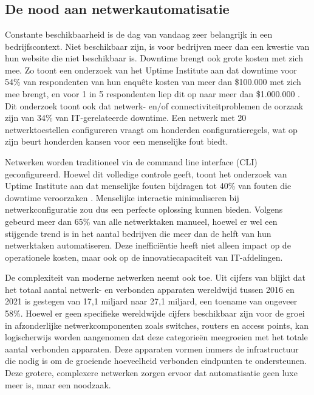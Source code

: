 \chapter{}%
\label{ch:stand-van-zaken}

\section{De nood aan netwerkautomatisatie}
\label{sec:automatisatie}

Constante beschikbaarheid is de dag van vandaag zeer belangrijk in een bedrijfscontext.
Niet beschikbaar zijn, is voor bedrijven meer dan een kwestie van hun website die niet beschikbaar is. 
Downtime brengt ook grote kosten met zich mee. Zo toont een onderzoek van het Uptime Institute aan dat downtime voor 54\% van respondenten van hun enquête kosten van meer dan \$100.000 met zich mee brengt, en voor 1 in 5 respondenten liep dit op naar meer dan \$1.000.000 \autocite{UptimeInstitute2025}.
Dit onderzoek toont ook dat netwerk- en/of connectiviteitproblemen de oorzaak zijn van 34\% van IT-gerelateerde downtime. Een netwerk met 20 netwerktoestellen configureren vraagt om honderden configuratieregels, wat op zijn beurt honderden kansen voor een menselijke fout biedt. 

Netwerken worden traditioneel via de command line interface (CLI) geconfigureerd.
Hoewel dit volledige controle geeft, toont het onderzoek van Uptime Institute aan dat menselijke fouten bijdragen tot 40\% van fouten die downtime veroorzaken \autocite{UptimeInstitute2025}. 
Menselijke interactie minimaliseren bij netwerkconfiguratie zou dus een perfecte oplossing kunnen bieden. 
Volgens \textcite{Gartner2023} gebeurd meer dan 65\% van alle netwerktaken manueel, hoewel er wel een stijgende trend is in het aantal bedrijven die meer dan de helft van hun netwerktaken automatiseren.
Deze inefficiëntie heeft niet alleen impact op de operationele kosten, maar ook op de innovatiecapaciteit van IT-afdelingen.

De complexiteit van moderne netwerken neemt ook toe. 
Uit cijfers van \textcite{shi2021devicegrowth} blijkt dat het totaal aantal netwerk- en verbonden apparaten wereldwijd tussen 2016 en 2021 is gestegen van 17,1 miljard naar 27,1 miljard, een toename van ongeveer 58\%.
Hoewel er geen specifieke wereldwijde cijfers beschikbaar zijn voor de groei in afzonderlijke netwerkcomponenten zoals switches, routers en access points, kan logischerwijs worden aangenomen dat deze categorieën meegroeien met het totale aantal verbonden apparaten.
Deze apparaten vormen immers de infrastructuur die nodig is om de groeiende hoeveelheid verbonden eindpunten te ondersteunen.
Deze grotere, complexere netwerken zorgen ervoor dat automatisatie geen luxe meer is, maar een noodzaak.

